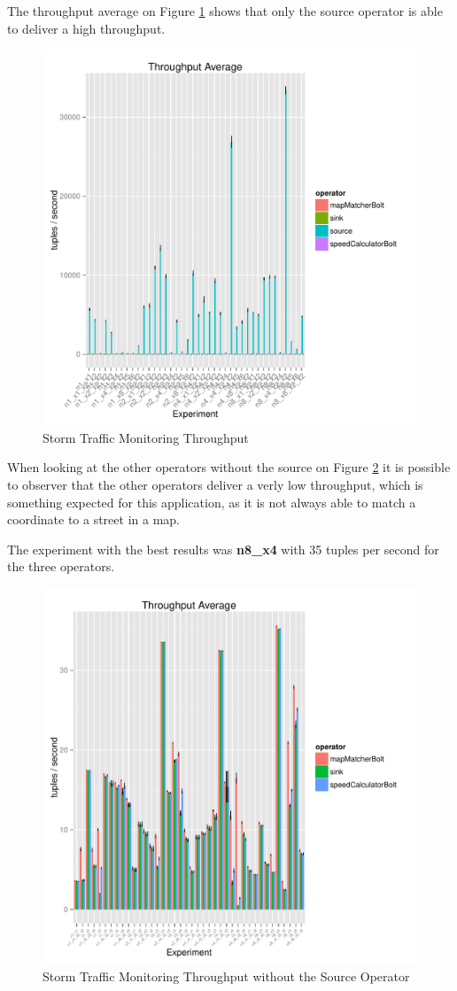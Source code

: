 \documentclass[ppgc,diss,english]{iiufrgs}
\begin{document}
The throughput average on Figure \ref{fig:storm_trafficmonitoring_throughput} shows that only the source operator is able to deliver a high throughput.

\begin{figure}[H]
    \centering
	\includegraphics[width=.6\textwidth]{summaries/storm_trafficmonitoring/full_throughput.pdf}
	\caption{Storm Traffic Monitoring Throughput}
	\label{fig:storm_trafficmonitoring_throughput}
\end{figure}

When looking at the other operators without the source on Figure \ref{fig:storm_trafficmonitoring_throughput2} it is possible to observer that the other operators deliver a verly low throughput, which is something expected for this application, as it is not always able to match a coordinate to a street in a map.

The experiment with the best results was \textbf{n8\_x4} with 35 tuples per second for the three operators.

\begin{figure}[H]
    \centering
	\includegraphics[width=.6\textwidth]{summaries/storm_trafficmonitoring/throughput2.pdf}
	\caption{Storm Traffic Monitoring Throughput without the Source Operator}
	\label{fig:storm_trafficmonitoring_throughput2}
\end{figure}
\end{document}
